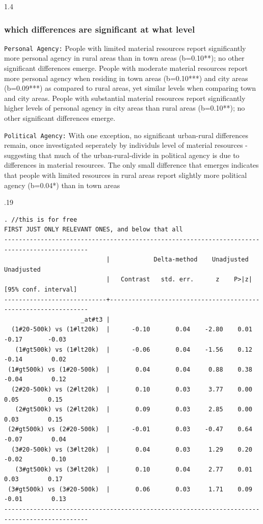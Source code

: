 \documentclass[10pt, letterpaper]{article}
\begin{document}
\begin{spacing}{1.4}
\subsubsection{which differences are significant at what level}
\texttt{Personal Agency:}
People with limited material resources report significantly more personal agency
in rural areas than in town areas (b=0.10**); no other significant differences
emerge.
People with moderate material resources report more personal agency when
residing in town areas (b=0.10***) and city areas (b=0.09***) as compared to
rural areas, yet similar levels when comparing town and city areas.
%
People with substantial material resources report significantly higher levels of
personal agency in city areas than rural areas (b=0.10**); no other significant
differences emerge.

\texttt{Political Agency:}
With one exception, no significant urban-rural differences remain, once investigated seperately by individuls level of material resources - suggesting that much of the urban-rural-divide in political agency is due to differences in material resources.
The only small difference that emerges indicates that people with limited
resources in rural areas report slightly more political agency (b=0.04*) than in
town areas



\begin{scriptsize}
\begin{spacing}{.19} 
\begin{verbatim}
. //this is for free
FIRST JUST ONLY RELEVANT ONES, and below that all
---------------------------------------------------------------------------------------------
                            |            Delta-method    Unadjusted           Unadjusted
                            |   Contrast   std. err.      z    P>|z|     [95% conf. interval]
----------------------------+----------------------------------------------------------------
                     _at#t3 |
  (1#20-500k) vs (1#lt20k)  |      -0.10       0.04    -2.80    0.01        -0.17       -0.03
   (1#gt500k) vs (1#lt20k)  |      -0.06       0.04    -1.56    0.12        -0.14        0.02
 (1#gt500k) vs (1#20-500k)  |       0.04       0.04     0.88    0.38        -0.04        0.12
  (2#20-500k) vs (2#lt20k)  |       0.10       0.03     3.77    0.00         0.05        0.15
   (2#gt500k) vs (2#lt20k)  |       0.09       0.03     2.85    0.00         0.03        0.15
 (2#gt500k) vs (2#20-500k)  |      -0.01       0.03    -0.47    0.64        -0.07        0.04
  (3#20-500k) vs (3#lt20k)  |       0.04       0.03     1.29    0.20        -0.02        0.10
   (3#gt500k) vs (3#lt20k)  |       0.10       0.04     2.77    0.01         0.03        0.17
 (3#gt500k) vs (3#20-500k)  |       0.06       0.03     1.71    0.09        -0.01        0.13
---------------------------------------------------------------------------------------------



\end{verbatim}
\end{spacing}
\end{scriptsize}
\end{spacing}
\end{document}
